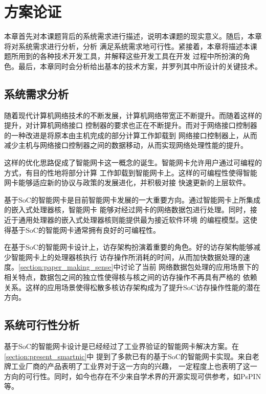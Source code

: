 
\section{方案论证}

本章首先对本课题背后的系统需求进行描述，说明本课题的现实意义。随后，本章将对系统需求进行分析，分析
满足系统需求地可行性。紧接着，本章将描述本课题所用到的各种技术开发工具，并解释这些开发工具在开发
过程中所扮演的角色。最后，本章同时会分析给出基本的技术方案，并罗列其中所设计的关键技术。

\subsection{系统需求分析}

随着现代计算机网络技术的不断发展，计算机网络带宽正不断提升。而随着这样的提升，对计算机网络接口
控制器的要求也正在不断提升。而对于网络接口控制器的一种改进是将原本由主机完成的部分计算工作卸载到
网络接口控制器上，从而减少主机与网络接口控制器之间的数据移动，从而实现网络处理性能的提升。

这样的优化思路促成了智能网卡这一概念的诞生。智能网卡允许用户通过可编程的方式，有目的性地将部分计算
工作卸载到智能网卡上。这样的可编程性使得智能网卡能够适应新的协议与政策的发展进化，并积极对接
快速更新的上层软件。

基于SoC的智能网卡是目前智能网卡发展的一大重要方向。通过智能网卡上所集成的嵌入式处理器核，智能网卡
能够对经过网卡的网络数据包进行处理。同时，接近于通用处理器的嵌入式处理器核则能提供最为接近软件环境
的编程模型。这使得基于SoC的智能网卡通常拥有良好的可编程性。

在基于SoC的智能网卡设计上，访存架构扮演着重要的角色。好的访存架构能够减少智能网卡上的处理器核执行
访存操作所消耗的时间，从而加快数据处理的速度。\autoref{section:paper_making_sense}中讨论了当前
网络数据包处理的应用场景下的相关特点，数据包之间的独立性使得核与核之间的访存操作不再具有严格的
依赖关系。这样的应用场景使得松散多核访存架构成为了提升SoC访存操作性能的潜在方向。

\subsection{系统可行性分析}

基于SoC的智能网卡设计是已经经过了工业界验证的智能网卡解决方案。在\autoref{section:present_smartnic}中
提到了多款已有的基于SoC的智能网卡实现。来自老牌工业厂商的产品表明了工业界对于这一方向的兴趣，
一定程度上也表明了这一方向的可行性。同时，如今也存在不少来自学术界的开源实现可供参考，如PsPIN\cite{di2020pspin}等。

